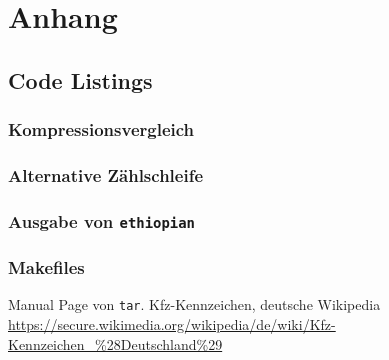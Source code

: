 \documentclass[12pt]{report}
\newcommand\gqq[1]{\glqq #1\grqq}
\begin{document}
\part{Anhang}
\begin{appendix}


\chapter{Code Listings}
\section{Kompressionsvergleich}
\label{listing:compression}


\section{Alternative Zählschleife}
\label{listing:zahlen2}


 


\section{Ausgabe von \texttt{ethiopian}}


\section{Makefiles}





\end{appendix}

\begin{thebibliography}{n}
 Manual Page von \texttt{tar}.
 \gqq{Kfz-Kennzeichen}, deutsche Wikipedia \url{https://secure.wikimedia.org/wikipedia/de/wiki/Kfz-Kennzeichen_\%28Deutschland\%29}
\end{thebibliography}
\end{document}
